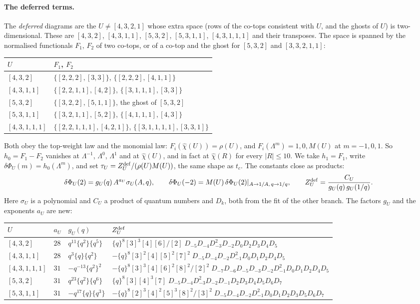\documentclass[11pt]{article}
\newcommand{\Lam}{\Lambda}
\newcommand{\chih}{\hat\chi}
\begin{document}
\paragraph{The deferred terms.}  The \emph{deferred} diagrams are the $U\ne[4,3,2,1]$ whose extra space (rows of the
co-tops consistent with $U$, and the ghosts of $U$) is two-dimensional.  These are $[4,3,2]$, $[4,3,1,1]$, $[5,3,2]$,
$[5,3,1,1]$, $[4,3,1,1,1]$ and their transposes.  The space is spanned by the normalised functionals $F_1$, $F_2$ of two
co-tops, or of a co-top and the ghost for $[5,3,2]$ and $[3,3,2,1,1]$:
\begin{center}
\begin{tabular}{ll}
\toprule
$U$ & $F_1$, $F_2$\\
\midrule
$[4,3,2]$ & $\{[2,2,2],[3,3]\}$, $\{[2,2,2],[4,1,1]\}$\\
$[4,3,1,1]$ & $\{[2,2,1,1],[4,2]\}$, $\{[3,1,1,1],[3,3]\}$\\
$[5,3,2]$ & $\{[3,2,2],[5,1,1]\}$, the ghost of $[5,3,2]$\\
$[5,3,1,1]$ & $\{[3,2,1,1],[5,2]\}$, $\{[4,1,1,1],[4,3]\}$\\
$[4,3,1,1,1]$ & $\{[2,2,1,1,1],[4,2,1]\}$, $\{[3,1,1,1,1],[3,3,1]\}$\\
\bottomrule
\end{tabular}
\end{center}
Both obey the top-weight law and the monomial law: $F_i(\chih(U))=\rho(U)$, and $F_i(\Lam^m)=1,0,M(U)$ at $m=-1,0,1$.  So
$h_0=F_1-F_2$ vanishes at $\Lam^{-1}$, $\Lam^0$, $\Lam^1$ and at $\chih(U)$, and in fact at $\chih(R)$ for every
$|R|\le10$.  We take $h_1=F_1$, write $\delta\Phi_U(m)=h_0(\Lam^m)$, and set $\tau_U=Z^{\rm def}_U/(\rho(U)M(U))$, the same
shape as $t_c$.  The constants close as products:
\[
\delta\Phi_U(2)=g_U(q)\,A^{a_U}\sigma_U(A,q),\qquad \delta\Phi_U(-2)=M(U)\,\delta\Phi_U(2)|_{A\to1/A,\,q\to1/q},\qquad
Z^{\rm def}_U=\frac{C_U}{g_U(q)\,g_U(1/q)}.
\]
Here $\sigma_U$ is a polynomial and $C_U$ a product of quantum numbers and $D_k$, both from the fit of the other branch.
The factors $g_U$ and the exponents $a_U$ are new:
\begin{center}
\small
\begin{tabular}{llll}
\toprule
$U$ & $a_U$ & $g_U(q)$ & $Z^{\rm def}_U$\\
\midrule
$[4,3,2]$ & $28$ & $q^{11}\{q^2\}\{q^5\}$ & $\{q\}^8[3]^3[4][6]/[2]\;D_{-5}D_{-4}D_{-3}^2D_{-2}D_0D_2D_3D_4D_5$\\
$[4,3,1,1]$ & $28$ & $q^{3}\{q\}\{q^2\}$ & $-\{q\}^8[3]^2[4][5]^2[7]^2\;D_{-5}D_{-4}D_{-2}D_{-1}^2D_0D_1D_2D_4D_5$\\
$[4,3,1,1,1]$ & $31$ & $-q^{-13}\{q^2\}^2$ & $-\{q\}^8[3]^3[4][6]^2[8]^2/[2]^2\;D_{-7}D_{-6}D_{-5}D_{-3}D_{-2}D_{-1}^2D_0D_1D_2D_4D_5$\\
$[5,3,2]$ & $31$ & $q^{23}\{q^2\}\{q^6\}$ & $\{q\}^8[3][4]^3[7]\;D_{-5}D_{-4}D_{-3}^2D_{-2}D_{-1}D_2D_3D_4D_5D_6D_7$\\
$[5,3,1,1]$ & $31$ & $-q^{17}\{q\}\{q^3\}$ & $-\{q\}^8[2]^3[4]^2[5]^3[8]^2/[3]^2\;D_{-5}D_{-4}D_{-2}D_{-1}^2D_0D_1D_2D_3D_5D_6D_7$\\
\bottomrule
\end{tabular}
\end{center}
\end{document}
